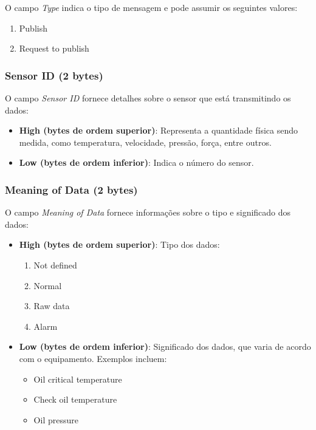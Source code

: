 O campo \textit{Type} indica o tipo de mensagem e pode assumir os seguintes valores:
\begin{enumerate}
    \item Publish
    \item Request to publish
\end{enumerate}

\subsubsection{Sensor ID (2 bytes)}

O campo \textit{Sensor ID} fornece detalhes sobre o sensor que está transmitindo os dados:

\begin{itemize}
    \item \textbf{High (bytes de ordem superior)}: Representa a quantidade física sendo medida, como temperatura, velocidade, pressão, força, entre outros.
    \item \textbf{Low (bytes de ordem inferior)}: Indica o número do sensor.
\end{itemize}

\subsubsection{Meaning of Data (2 bytes)}

O campo \textit{Meaning of Data} fornece informações sobre o tipo e significado dos dados:

\begin{itemize}
    \item \textbf{High (bytes de ordem superior)}: Tipo dos dados:
    \begin{enumerate}
        \item Not defined
        \item Normal
        \item Raw data
        \item Alarm
    \end{enumerate}
    \item \textbf{Low (bytes de ordem inferior)}: Significado dos dados, que varia de acordo com o equipamento. Exemplos incluem:
    \begin{itemize}
        \item Oil critical temperature
        \item Check oil temperature
        \item Oil pressure
    \end{itemize}
\end{itemize}

